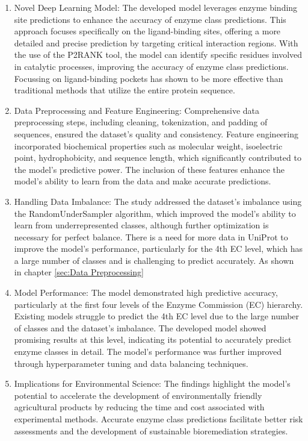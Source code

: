 \begin{enumerate}
    \item Novel Deep Learning Model: The developed model leverages enzyme binding site predictions to enhance the accuracy of enzyme class predictions. This approach focuses specifically on the ligand-binding sites, offering a more detailed and precise prediction by targeting critical interaction regions. With the use of the P2RANK tool, the model can identify specific residues involved in catalytic processes, improving the accuracy of enzyme class predictions. Focussing on ligand-binding pockets has shown to be more effective than traditional methods that utilize the entire protein sequence.
    \item Data Preprocessing and Feature Engineering: Comprehensive data preprocessing steps, including cleaning, tokenization, and padding of sequences, ensured the dataset's quality and consistency. Feature engineering incorporated biochemical properties such as molecular weight, isoelectric point, hydrophobicity, and sequence length, which significantly contributed to the model's predictive power. The inclusion of these features enhance the model's ability to learn from the data and make accurate predictions.
    \item Handling Data Imbalance: The study addressed the dataset's imbalance using the RandomUnderSampler algorithm, which improved the model's ability to learn from underrepresented classes, although further optimization is necessary for perfect balance. There is a need for more data in UniProt to improve the model's performance, particularly for the 4th EC level, which has a large number of classes and is challenging to predict accurately. As shown in chapter \ref{sec:Data Preprocessing}
    \item Model Performance: The model demonstrated high predictive accuracy, particularly at the first four levels of the Enzyme Commission (EC) hierarchy. Existing models struggle to predict the 4th EC level due to the large number of classes and the dataset's imbalance. The developed model showed promising results at this level, indicating its potential to accurately predict enzyme classes in detail. The model's performance was further improved through hyperparameter tuning and data balancing techniques.
    \item Implications for Environmental Science: The findings highlight the model's potential to accelerate the development of environmentally friendly agricultural products by reducing the time and cost associated with experimental methods. Accurate enzyme class predictions facilitate better risk assessments and the development of sustainable bioremediation strategies.
\end{enumerate}


